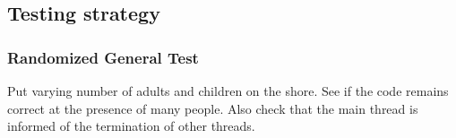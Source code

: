 \documentclass{article}
\begin{document}
	\subsection{Testing strategy}
	
	\subsubsection*{Randomized General Test}
	Put varying number of adults and children on the shore. See if the code remains correct at the presence of many people. Also check that the main thread is informed of the termination of other threads.
\end{document}
